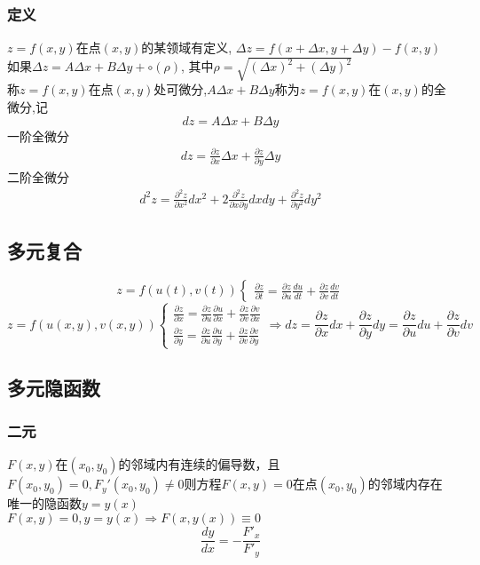 \subsubsection{定义}
$z=f(x,y)$\mbox{在点}$(x,y)$\mbox{的某领域有定义},
$\Delta z=f(x+\Delta x,y+\Delta y)-f(x,y)$\\
如果$\Delta z=A\Delta x+B\Delta y+\circ(\rho)$,
其中$\rho=\sqrt{(\Delta x)^2+(\Delta y)^2}$\\
称$z=f(x,y)$在点$(x,y)$处可微分,$A\Delta x+B\Delta y$称为$z=f(x,y)$在$(x,y)$的全微分,记
$$dz=A\Delta x+B\Delta y$$
一阶全微分
\begin{align}
	dz=\frac{\partial z}{\partial x}\Delta x+\frac{\partial z}{\partial y}\Delta y\label{Total_differential}
\end{align}
二阶全微分
\begin{align}
	d^2z=\frac{\partial^2 z}{\partial x^2}dx^2+2\frac{\partial^2 z}{\partial x\partial y}dxdy+\frac{\partial^2 z}{\partial y^2}dy^2\label{Total_differential}
\end{align}
\subsection{多元复合}
$$z=f(u(t),v(t))\begin{cases}
	\frac{\partial z}{\partial t}=\frac{\partial z}{\partial u}\frac{du}{dt}+\frac{\partial z}{\partial v}\frac{dv}{dt}
\end{cases}$$
$$z=f(u(x,y),v(x,y))\begin{cases}
	\frac{\partial z}{\partial x}=\frac{\partial z}{\partial u}\frac{\partial u}{\partial x}+\frac{\partial z}{\partial v}\frac{\partial v}{\partial x}\\
	\frac{\partial z}{\partial y}=\frac{\partial z}{\partial u}\frac{\partial u}{\partial y}+\frac{\partial z}{\partial v}\frac{\partial v}{\partial y}
\end{cases}\Rightarrow dz=\frac{\partial z}{\partial x}dx+\frac{\partial z}{\partial y}dy=\frac{\partial z}{\partial u}du+\frac{\partial z}{\partial v}dv$$
\subsection{多元隐函数}
\subsubsection{二元}
$F(x,y)$在$(x_0,y_0)$的邻域内有连续的偏导数，且$F(x_0,y_0)=0,F_y'(x_0,y_0)\neq 0$则方程$F(x,y)=0$在点$(x_0,y_0)$的邻域内存在唯一的隐函数$y=y(x)$\\
$F(x,y)=0,y=y(x)\Rightarrow F(x,y(x))\equiv0$
$$\frac{dy}{dx}=-\frac{F'_x}{F'_y}$$
